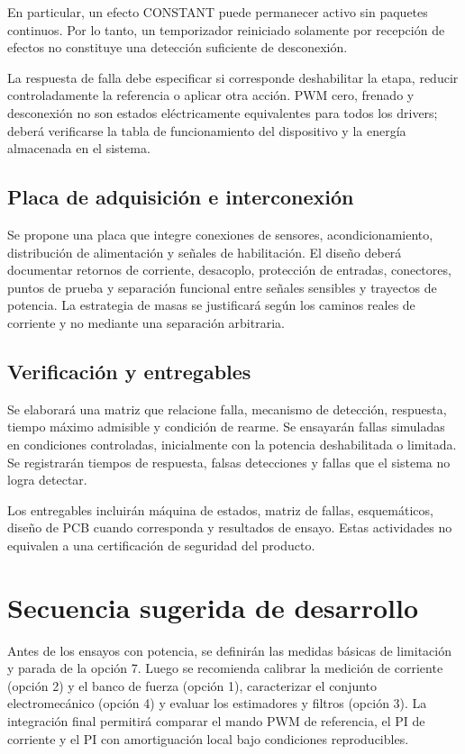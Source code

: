 \documentclass[11pt,a4paper]{article}
\begin{document}
En particular, un efecto CONSTANT puede permanecer activo sin paquetes
continuos. Por lo tanto, un temporizador reiniciado solamente por recepción
de efectos no constituye una detección suficiente de desconexión.

La respuesta de falla debe especificar si corresponde deshabilitar la etapa,
reducir controladamente la referencia o aplicar otra acción. PWM cero,
frenado y desconexión no son estados eléctricamente equivalentes para todos
los drivers; deberá verificarse la tabla de funcionamiento del dispositivo
y la energía almacenada en el sistema.

\subsection{Placa de adquisición e interconexión}
Se propone una placa que integre conexiones de sensores, acondicionamiento,
distribución de alimentación y señales de habilitación. El diseño deberá
documentar retornos de corriente, desacoplo, protección de entradas,
conectores, puntos de prueba y separación funcional entre señales sensibles
y trayectos de potencia. La estrategia de masas se justificará según los
caminos reales de corriente y no mediante una separación arbitraria.

\subsection{Verificación y entregables}
Se elaborará una matriz que relacione falla, mecanismo de detección, respuesta,
tiempo máximo admisible y condición de rearme. Se ensayarán fallas simuladas
en condiciones controladas, inicialmente con la potencia deshabilitada o
limitada. Se registrarán tiempos de respuesta, falsas detecciones y fallas
que el sistema no logra detectar.

Los entregables incluirán máquina de estados, matriz de fallas, esquemáticos,
diseño de PCB cuando corresponda y resultados de ensayo. Estas actividades
no equivalen a una certificación de seguridad del producto.

\section*{Secuencia sugerida de desarrollo}

Antes de los ensayos con potencia, se definirán las medidas básicas de
limitación y parada de la opción 7. Luego se recomienda calibrar la medición
de corriente (opción 2) y el banco de fuerza (opción 1), caracterizar el
conjunto electromecánico (opción 4) y evaluar los estimadores y filtros
(opción 3). La integración final permitirá comparar el mando PWM de
referencia, el PI de corriente y el PI con amortiguación local bajo
condiciones reproducibles.
\end{document}
